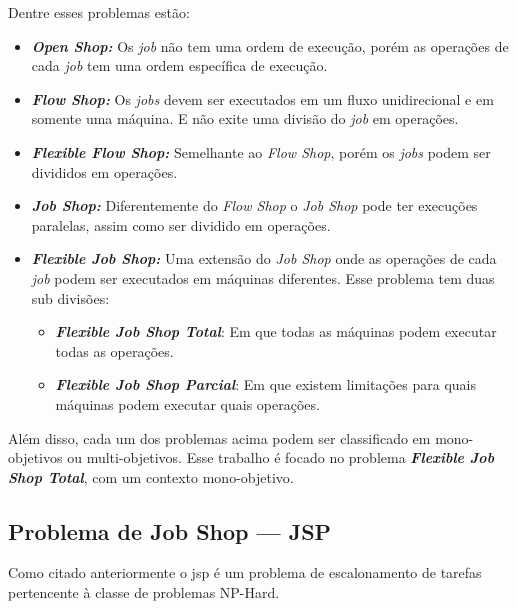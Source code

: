 \noindent Dentre esses problemas estão:
\begin{itemize}
    \item \textbf{\textit{Open Shop:}} Os \textit{job} não tem uma ordem de execução, porém as operações de cada \textit{job} tem uma ordem específica de execução.
    
    \item \textbf{\textit{Flow Shop:}} Os \textit{jobs} devem ser executados em um fluxo unidirecional e em somente uma máquina. E não exite uma divisão do \textit{job} em operações.
    
    \item \textbf{\textit{Flexible Flow Shop:}} Semelhante ao \textit{Flow Shop}, porém os \textit{jobs} podem ser divididos em operações.
    
    \item \textbf{\textit{Job Shop:}} Diferentemente do \textit{Flow Shop} o \textit{Job Shop} pode ter execuções paralelas, assim como ser dividido em operações.
    
    \item \textbf{\textit{Flexible Job Shop:}} Uma extensão do \textit{Job Shop} onde as operações de cada \textit{job} podem ser executados em máquinas diferentes. Esse problema tem duas sub divisões:
    \begin{itemize}
    \label{items:tfjsp-pfjsp}
    \item \textbf{\textit{Flexible Job Shop Total}}: Em que todas as máquinas podem executar todas as operações. 
    \item \textbf{\textit{Flexible Job Shop Parcial}}: Em que existem limitações para quais máquinas podem executar quais operações.
    \end{itemize}
\end{itemize}
\noindent Além disso, cada um dos problemas acima podem ser classificado em mono-objetivos ou multi-objetivos. Esse trabalho é focado no problema \textbf{\textit{Flexible Job Shop Total}}, com um contexto mono-objetivo.
\subsection{Problema de Job Shop — JSP}
Como citado anteriormente o \gls{jsp} é um problema de escalonamento de tarefas pertencente à classe de problemas NP-Hard.


